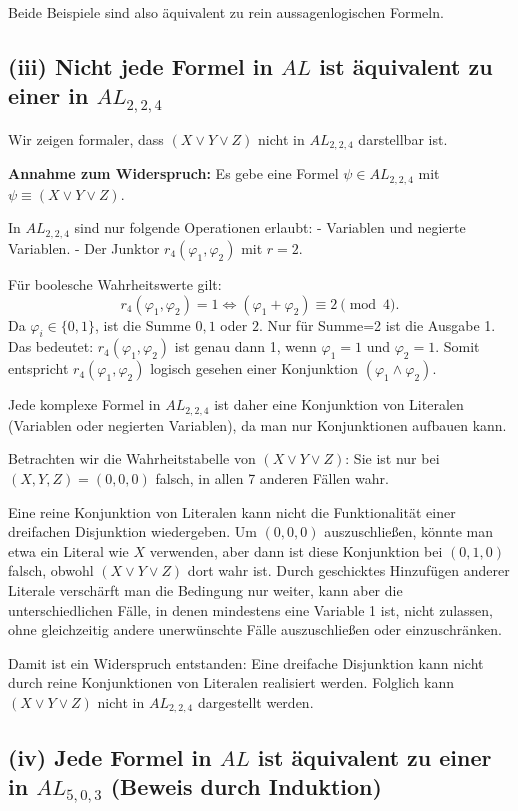 \documentclass[12pt,a4paper]{article}
\begin{document}
Beide Beispiele sind also äquivalent zu rein aussagenlogischen Formeln.

\subsection*{(iii) Nicht jede Formel in $AL$ ist äquivalent zu einer in $AL_{2,2,4}$}

Wir zeigen formaler, dass $(X \lor Y \lor Z)$ nicht in $AL_{2,2,4}$ darstellbar ist.

\textbf{Annahme zum Widerspruch:}  
Es gebe eine Formel $\psi \in AL_{2,2,4}$ mit $\psi \equiv (X \lor Y \lor Z)$.

In $AL_{2,2,4}$ sind nur folgende Operationen erlaubt:
- Variablen und negierte Variablen.
- Der Junktor $r_4(\varphi_1,\varphi_2)$ mit $r=2$.

Für boolesche Wahrheitswerte gilt:
\[
r_4(\varphi_1,\varphi_2)=1 \iff (\varphi_1+\varphi_2) \equiv 2 \pmod{4}.
\]
Da $\varphi_i \in \{0,1\}$, ist die Summe $0,1$ oder $2$. Nur für Summe=2 ist die Ausgabe 1. Das bedeutet: $r_4(\varphi_1,\varphi_2)$ ist genau dann 1, wenn $\varphi_1=1$ und $\varphi_2=1$. Somit entspricht $r_4(\varphi_1,\varphi_2)$ logisch gesehen einer Konjunktion $(\varphi_1 \land \varphi_2)$.

Jede komplexe Formel in $AL_{2,2,4}$ ist daher eine Konjunktion von Literalen (Variablen oder negierten Variablen), da man nur Konjunktionen aufbauen kann.

Betrachten wir die Wahrheitstabelle von $(X \lor Y \lor Z)$: Sie ist nur bei $(X,Y,Z)=(0,0,0)$ falsch, in allen 7 anderen Fällen wahr.

Eine reine Konjunktion von Literalen kann nicht die Funktionalität einer dreifachen Disjunktion wiedergeben. Um $(0,0,0)$ auszuschließen, könnte man etwa ein Literal wie $X$ verwenden, aber dann ist diese Konjunktion bei $(0,1,0)$ falsch, obwohl $(X \lor Y \lor Z)$ dort wahr ist. Durch geschicktes Hinzufügen anderer Literale verschärft man die Bedingung nur weiter, kann aber die unterschiedlichen Fälle, in denen mindestens eine Variable 1 ist, nicht zulassen, ohne gleichzeitig andere unerwünschte Fälle auszuschließen oder einzuschränken.

Damit ist ein Widerspruch entstanden: Eine dreifache Disjunktion kann nicht durch reine Konjunktionen von Literalen realisiert werden. Folglich kann $(X \lor Y \lor Z)$ nicht in $AL_{2,2,4}$ dargestellt werden.

\subsection*{(iv) Jede Formel in $AL$ ist äquivalent zu einer in $AL_{5,0,3}$ (Beweis durch Induktion)}
\end{document}
